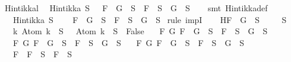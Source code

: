 \begin{isabellebody}
%
\endisatagproof
{\isafoldproof}%
%
\isadelimproof
\isanewline
%
\endisadelimproof
\isanewline
{}\isamarkupfalse%
\ Hintikka{\isacharunderscore}l{}{\isacharcolon}\ \isanewline
\ {\isachardoublequoteopen}Hintikka\ S\ {\isasymLongrightarrow}\ \ {\isacharparenleft}F\ \isactrlbold {\isasymor}\ G\ {\isasymin}\ S\ {\isasymlongrightarrow}\ F\ {\isasymin}\ S\ {\isasymor}\ G\ {\isasymin}\ S{\isacharparenright}{\isachardoublequoteclose}\isanewline
%
\isadelimproof
\ \ %
\endisadelimproof
%
\isatagproof
{}\isamarkupfalse%
\ {\isacharparenleft}smt\ Hintikka{\isacharunderscore}def{\isacharparenright}%
\endisatagproof
{\isafoldproof}%
%
\isadelimproof
\isanewline
%
\endisadelimproof
\isanewline
{}\isamarkupfalse%
\isanewline
\ \ \ {\isachardoublequoteopen}Hintikka\ S{\isachardoublequoteclose}\ \isanewline
\ \ \ {\isachardoublequoteopen}F\ \isactrlbold {\isasymrightarrow}\ G\ {\isasymin}\ S\ {\isasymlongrightarrow}\ \isactrlbold {\isasymnot}F\ {\isasymin}\ S\ {\isasymor}\ G\ {\isasymin}\ S{\isachardoublequoteclose}\isanewline
%
\isadelimproof
%
\endisadelimproof
%
\isatagproof
{}\isamarkupfalse%
\ {\isacharparenleft}rule\ impI{\isacharparenright}\isanewline
\ \ \isamarkupfalse%
\ H{\isacharcolon}{\isachardoublequoteopen}F\ \isactrlbold {\isasymrightarrow}\ G\ {\isasymin}\ S{\isachardoublequoteclose}\isanewline
\ \isamarkupfalse%
\ {\isachardoublequoteopen}{\isasymbottom}\ {\isasymnotin}\ S\isanewline
\ \ {\isasymand}\ {\isacharparenleft}{\isasymforall}k{\isachardot}\ Atom\ k\ {\isasymin}\ S\ {\isasymlongrightarrow}\ \isactrlbold {\isasymnot}\ {\isacharparenleft}Atom\ k{\isacharparenright}\ {\isasymin}\ S\ {\isasymlongrightarrow}\ False{\isacharparenright}\isanewline
\ \ {\isasymand}\ {\isacharparenleft}{\isasymforall}F\ G{\isachardot}\ F\ \isactrlbold {\isasymand}\ G\ {\isasymin}\ S\ {\isasymlongrightarrow}\ F\ {\isasymin}\ S\ {\isasymand}\ G\ {\isasymin}\ S{\isacharparenright}\isanewline
\ \ {\isasymand}\ {\isacharparenleft}{\isasymforall}F\ G{\isachardot}\ F\ \isactrlbold {\isasymor}\ G\ {\isasymin}\ S\ {\isasymlongrightarrow}\ F\ {\isasymin}\ S\ {\isasymor}\ G\ {\isasymin}\ S{\isacharparenright}\isanewline
\ \ {\isasymand}\ {\isacharparenleft}{\isasymforall}F\ G{\isachardot}\ F\ \isactrlbold {\isasymrightarrow}\ G\ {\isasymin}\ S\ {\isasymlongrightarrow}\ \isactrlbold {\isasymnot}F\ {\isasymin}\ S\ {\isasymor}\ G\ {\isasymin}\ S{\isacharparenright}\isanewline
\ \ {\isasymand}\ {\isacharparenleft}{\isasymforall}F{\isachardot}\ \isactrlbold {\isasymnot}\ {\isacharparenleft}\isactrlbold {\isasymnot}F{\isacharparenright}\ {\isasymin}\ S\ {\isasymlongrightarrow}\ F\ {\isasymin}\ S{\isacharparenright}\isanewline

\end{isabellebody}
